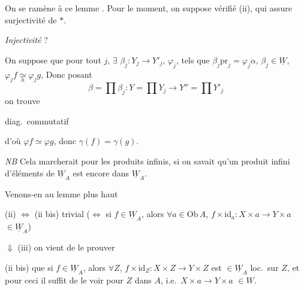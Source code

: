 \documentclass[11pt,a4paper]{article}
\begin{document}
On se ramène à ce lemme . Pour le moment, on suppose
vérifié (ii), qui assure surjectivité de $\ast$.

\emph{Injectivité} ?


On suppose que pour tout $j$, $\exists$ $\beta_j : Y_j \to Y'_j$,
$\varphi_j$, tels que $\beta_j \mathrm{pr}_j = \varphi_j \alpha$, $\beta_j
\in \underline{W}$, $\varphi_j f \underset{h}{\simeq} \varphi_j g$,
 Donc \struck{\ill{}} posant
\[
  \beta = \prod \beta_j : Y = \prod Y_j \to Y'' = \prod Y'_j
\]
\struck{\ill{}} on trouve


diag.\ commutatif


d'où $\varphi f \simeq \varphi g$, donc $\gamma(f) = \gamma(g)$.

\emph{NB} Cela marcherait pour les produits infinis, si on savait qu'un
produit infini d'éléments de $\underline{W}_A$ est encore dans
$\underline{W}_A$.

Venons-en au lemme plus haut

(ii) $\Longleftrightarrow$ (ii bis) trivial ($\Longleftrightarrow$ si
$f \in \underline{W}_A$, alors $\forall a \in \mathrm{Ob}\,A$, $f \times
\mathrm{id}_a : X \times a \to Y \times a$ $\in \underline{W}_A$)

$\Downarrow$ (iii) on vient de le prouver

 (ii bis)   que si
$f \in \underline{W}_A$, alors $\forall Z$, $f \times \mathrm{id}_Z : X
\times Z \to Y \times Z$ est $\in \underline{W}_A$ loc.\ sur $Z$, et pour
ceci il suffit de le voir pour $Z$ dans $A$, i.e.\ $X \times a \to Y \times
a$ $\in W$.
\end{document}
